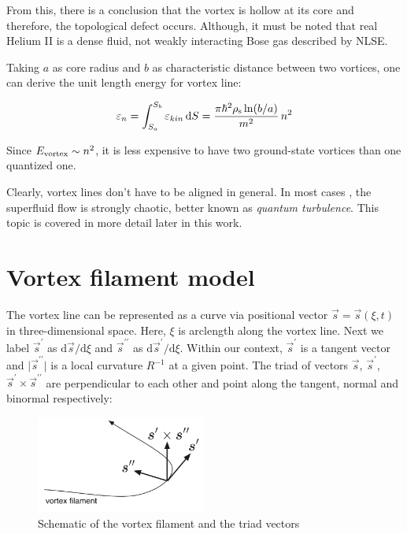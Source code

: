 From this, there is a conclusion that the vortex is hollow at its core and therefore, the topological defect occurs. Although, it must be noted that real Helium II is a dense fluid, not weakly interacting Bose gas described by NLSE.

Taking $a$ as core radius and $b$ as characteristic distance between two vortices, one can derive the unit length energy for vortex line:

\begin{equation}
\varepsilon_n
= \int_{S_a}^{S_b} \varepsilon_{kin}\,\mathrm{d}S
= \frac{\pi \hbar^2 \rho_{\mathrm{s}} \ln(b/a)}{m^2}\, n^2
\label{eps_n}
\end{equation}

Since $E_{\mathrm{vortex}} \sim n^2$, it is less expensive to have two ground-state vortices than one quantized one.

Clearly, vortex lines don't have to be aligned in general. In most cases , the superfluid flow is strongly chaotic, better known as \textit{quantum turbulence}. This topic is covered in more detail later in this work.

\newpage

\section{Vortex filament model}

The vortex line can be represented as a curve via positional vector $\vec{s} = \vec{s}(\xi, t)$ in three-dimensional space. Here, $\xi$ is arclength along the vortex line. Next we label $\vec{s}^{\prime}$ as $\text{d}\vec{s} / \text{d} \xi$ and $\vec{s}^{\prime\prime}$ as $\text{d}\vec{s}^{\prime} / \text{d} \xi$.
Within our context, $\vec{s}^{\prime}$ is a tangent vector and $\vert \vec{s}^{\prime\prime} \vert$ is a local curvature $R^{-1}$ at a given point. The triad of vectors $\vec{s}$, $\vec{s}^{\prime}$, $\vec{s}^{\prime} \times \vec{s}^{\prime\prime}$ are perpendicular to each other and point along the tangent, normal and binormal respectively:

\begin{figure}[h]
	\centering
	\includegraphics[width=0.5\textwidth]{graphics/theory/filament}
	\caption{Schematic of the vortex filament and the triad vectors}
	\label{filament}
\end{figure}


